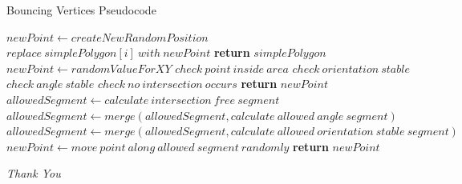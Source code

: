 \documentclass{beamer}
\begin{document}
\begin{frame}{Bouncing Vertices Pseudocode}
  \begin{algorithm}[H]
    \tiny
    \begin{algorithmic}[0]
            \State $newPoint \gets createNewRandomPosition$
            \State $replace\ simplePolygon[i]\ with\ newPoint$
          \EndFor
        \EndFor
        \State \textbf{return} $simplePolygon$
      \EndProcedure
      \vspace{3pt}
        \Repeat
          \State $newPoint \gets randomValueForXY$
          \State $check\ point\ inside\ area$
          \State $check\ orientation\ stable$
          \State $check\ angle\ stable$
          \State $check\ no\ intersection\ occurs$
        \State \textbf{return} $newPoint$
      \EndProcedure
      \vspace{3pt}
        \State $allowedSegment \gets calculate\ intersection\ free\ segment$
        \State $allowedSegment \gets merge(allowedSegment, calculate\ allowed\ angle\ segment)$
        \State $allowedSegment \gets merge(allowedSegment, calculate\ allowed\ orientation\ stable\ segment)$
        \State $newPoint \gets move\ point\ along\ allowed\ segment\ randomly$
        \State \textbf{return} $newPoint$
      \EndProcedure
    \end{algorithmic}
  \end{algorithm}
\end{frame}

\begin{frame}{}
  \centering \Large
  \emph{Thank You}
\end{frame}
\end{document}
